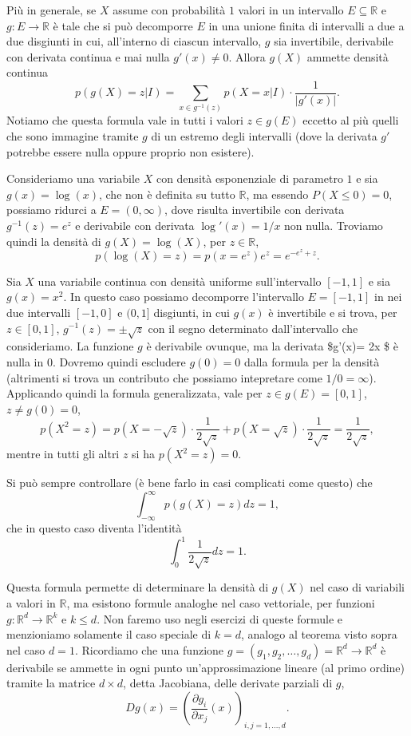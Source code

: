 \documentclass[
  italian,
  letterpaper,
]{book}
\newcommand{\bra}[1]{\left( #1 \right)}
\newcommand{\R}{\mathbb{R}}
\theoremstyle{definition}
\theoremstyle{remark}
\begin{document}
Più in generale, se \(X\) assume con probabilità \(1\) valori in un
intervallo \(E \subseteq \R\) e \(g:E \to \R\) è tale che si può
decomporre \(E\) in una unione finita di intervalli a due a due
disgiunti in cui, all'interno di ciascun intervallo, \(g\) sia
invertibile, derivabile con derivata continua e mai nulla
\(g'(x) \neq 0\). Allora \(g(X)\) ammette densità continua
\[ p(g(X) = z | I ) = \sum_{ x \in g^{-1}(z)} p( X =x  | I ) \cdot \frac{1}{|g'(x)|}.\]
Notiamo che questa formula vale in tutti i valori \(z \in g(E)\) eccetto
al più quelli che sono immagine tramite \(g\) di un estremo degli
intervalli (dove la derivata \(g'\) potrebbe essere nulla oppure proprio
non esistere).

Consideriamo una variabile \(X\) con densità esponenziale di parametro
\(1\) e sia \(g(x) =\log(x)\), che non è definita su tutto \(\R\), ma
essendo \(P(X \le 0) = 0\), possiamo ridurci a \(E = (0, \infty)\), dove
risulta invertibile con derivata \(g^{-1}(z)= e^z\) e derivabile con
derivata \(\log'(x) = 1/x\) non nulla. Troviamo quindi la densità di
\(g(X) = \log(X)\), per \(z \in \R\),
\[ p( \log(X) = z ) = p( x = e^z) e^z = e^{-e^z + z}.\]

Sia \(X\) una variabile continua con densità uniforme sull'intervallo
\([-1,1]\) e sia \(g(x)= x^2\). In questo caso possiamo decomporre
l'intervallo \(E = [-1,1]\) in nei due intervalli \([-1,0]\) e \((0,1]\)
disgiunti, in cui \(g(x)\) è invertibile e si trova, per
\(z \in [0,1]\), \(g^{-1}(z)=\pm\sqrt{z}\) con il segno determinato
dall'intervallo che consideriamo. La funzione \(g\) è derivabile
ovunque, ma la derivata \$g'(x)= 2x \$ è nulla in \(0\). Dovremo quindi
escludere \(g(0) = 0\) dalla formula per la densità (altrimenti si trova
un contributo che possiamo intepretare come \(1/0 = \infty\)).
Applicando quindi la formula generalizzata, vale per
\(z \in g(E) = [0,1]\), \(z \neq g(0) = 0\),
\[ p( X^2 = z) = p( X = -\sqrt{z}) \cdot \frac{1}{2 \sqrt{z}}+  p( X = \sqrt{z}) \cdot \frac{1}{2 \sqrt{z}} = \frac{1}{2 \sqrt{z}},\]
mentre in tutti gli altri \(z\) si ha \(p(X^2 = z) = 0\).

Si può sempre controllare (è bene farlo in casi complicati come questo)
che \[\int_{-\infty}^\infty p(g(X)= z) d z = 1,\] che in questo caso
diventa l'identità \[ \int_0^1 \frac{1}{2 \sqrt{z}} d z = 1.\]

Questa formula permette di determinare la densità di \(g(X)\) nel caso
di variabili a valori in \(\R\), ma esistono formule analoghe nel caso
vettoriale, per funzioni \(g:\R^d \to \R^k\) e \(k \le d\). Non faremo
uso negli esercizi di queste formule e menzioniamo solamente il caso
speciale di \(k=d\), analogo al teorema visto sopra nel caso \(d=1\).
Ricordiamo che una funzione
\(g = (g_1, g_2,\ldots, g_d)= \R^d \to \R^d\) è derivabile se ammette in
ogni punto un'approssimazione lineare (al primo ordine) tramite la
matrice \(d\times d\), detta Jacobiana, delle derivate parziali di
\(g\),
\[ Dg(x) = \bra{\frac{\partial g_i}{\partial x_j}(x)}_{i,j=1, \ldots, d}.\]
\end{document}
